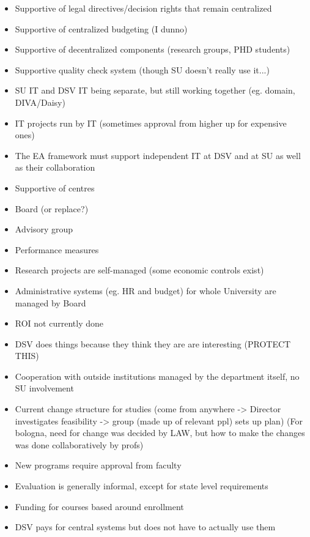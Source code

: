 \begin{itemize}


\item Supportive of legal directives/decision rights that remain centralized

\item Supportive of centralized budgeting (I dunno)

\item Supportive of decentralized components (research groups, PHD students)
 

\item Supportive quality check system (though SU doesn't really use it...)

 
\item SU IT and DSV IT being separate, but still working together (eg. domain, DIVA/Daisy)

\item IT projects run by IT (sometimes approval from higher up for expensive ones)

\item The EA framework must support independent IT at DSV and at SU as well as their collaboration

\item Supportive of centres

\item Board (or replace?)

\item Advisory group

\item Performance measures

\item Research projects are self-managed (some economic controls exist)

\item Administrative systems (eg. HR and budget) for whole University are managed by Board

\item ROI not currently done

\item DSV does things because they think they are are interesting (PROTECT THIS)

\item Cooperation with outside institutions managed by the department  itself, no SU involvement

\item Current change structure for studies (come from anywhere -> Director investigates feasibility -> group (made up of relevant ppl) sets up plan) (For bologna, need for change was decided by LAW, but how to make the changes was done collaboratively by profs)

\item New programs require approval from faculty

\item Evaluation is generally informal, except for state level requirements

\item Funding for courses based around enrollment 

\item DSV pays for central systems but does not have to actually use them

\end{itemize}
